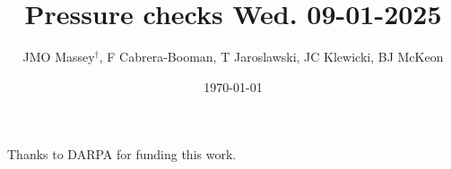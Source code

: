 \documentclass[aspectratio=169,9pt]{beamer}
\title{Pressure checks Wed. 09-01-2025}
\author{JMO Massey$^{\dag}$, F Cabrera-Booman, T Jaroslawski, JC Klewicki, BJ McKeon}
\institute{Center for Turbulence Research \\ Stanford University}
\date{\today}
\begin{document}
\begin{frame}
    \setcounter{framenumber}{0}
    \titlepage
    \vfill
    {\scriptsize \centering Thanks to DARPA for funding this work.\par}
\end{frame}

\end{document}
